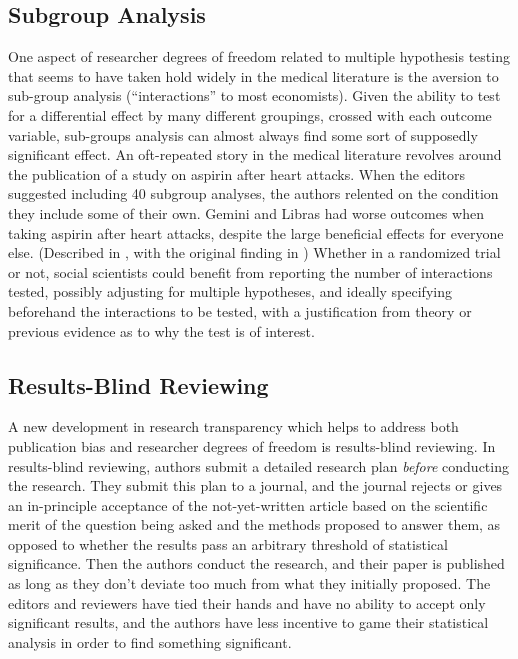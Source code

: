 \documentclass[12pt] {article}
\begin{document}
\subsection{Subgroup Analysis}
One aspect of researcher degrees of freedom related to multiple hypothesis testing that seems to have taken hold widely in the medical literature is the aversion to sub-group analysis (``interactions'' to
most economists). Given the ability to test for a differential effect by many different groupings, crossed with each outcome variable, sub-groups analysis can almost always find some sort of supposedly significant effect. An oft-repeated story in the medical literature revolves around the publication
of a study on aspirin after heart attacks. When the editors suggested including 40 subgroup analyses, the authors relented on the condition
they include some of their own. Gemini and Libras had worse outcomes
when taking aspirin after heart attacks, despite the large beneficial
effects for everyone else. (Described in \cite{schulz_multiplicity_2005},
with the original finding in \cite{isis-2_second_international_study_of_infarct_survival_collaborative_group_randomised_1988}) Whether in a randomized trial or
not, social scientists could benefit from reporting the number of
interactions tested, possibly adjusting for multiple hypotheses, and
ideally specifying beforehand the interactions to be tested, with a justification from theory or previous evidence as to why the test is of interest. 


\subsection{Results-Blind Reviewing}
A new development in research transparency which helps to address both publication bias and researcher degrees of freedom is results-blind reviewing. In results-blind reviewing, authors submit a detailed research plan \textit{before} conducting the research. They submit this plan to a journal, and the journal rejects or gives an in-principle acceptance of the not-yet-written article based on the scientific merit of the question being asked and the methods proposed to answer them, as opposed to whether the results pass an arbitrary threshold of statistical significance. Then the authors conduct the research, and their paper is published as long as they don't deviate too much from what they initially proposed. The editors and reviewers have tied their hands and have no ability to accept only significant results, and the authors have less incentive to game their statistical analysis in order to find something significant. 
\end{document}
